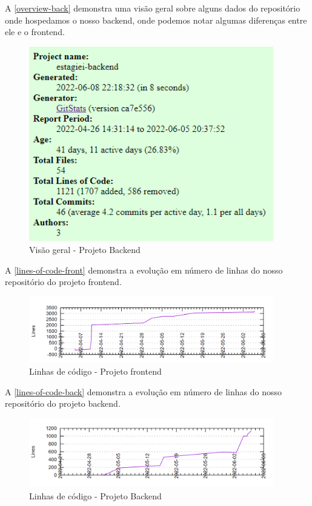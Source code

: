 A \autoref{overview-back} demonstra uma visão geral sobre alguns dados do repositório onde hospedamos o nosso backend, onde podemos notar algumas diferenças entre ele e o \gls{frontend}.
\begin{figure}[H]
	\centering
	\caption{\label{overview-back}Visão geral - Projeto Backend}
	\includegraphics[width=0.95\textwidth]{../imagens/stats/overview-backend.png}
\end{figure}

A \autoref{lines-of-code-front} demonstra a evolução em número de linhas do nosso repositório do projeto \gls{frontend}.
\begin{figure}[H]
	\centering
	\caption{\label{lines-of-code-front}Linhas de código - Projeto \gls{frontend}}
	\includegraphics[width=0.95\textwidth]{../imagens/stats/lines-of-code-frontend.png}
\end{figure}

A \autoref{lines-of-code-back} demonstra a evolução em número de linhas do nosso repositório do projeto backend.
\begin{figure}[H]
	\centering
	\caption{\label{lines-of-code-back}Linhas de código - Projeto Backend}
	\includegraphics[width=0.95\textwidth]{../imagens/stats/lines-of-code-backend.png}
\end{figure}

